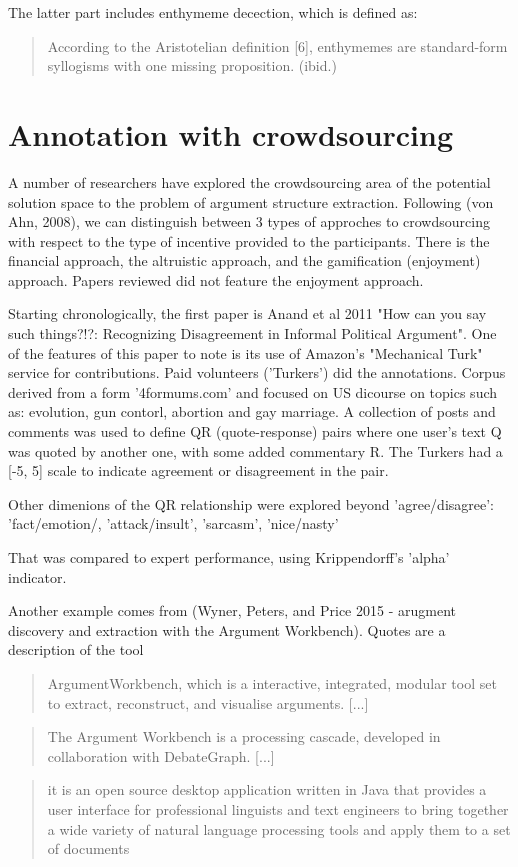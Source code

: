 \documentclass{article}
\begin{document}
The latter part includes enthymeme decection, which is defined as:
\begin{quote}
According to the Aristotelian definition [6], enthymemes are standard-form syllogisms with one missing proposition.  (ibid.)
\end{quote}
\cite[page 113]{Tefuel2017}

\section{Annotation with crowdsourcing}
A number of researchers have explored the crowdsourcing area of the potential solution space to the problem of argument structure extraction.
Following (von Ahn, 2008), we can distinguish between 3 types of approches to crowdsourcing with respect to the type of incentive provided to the participants.
There is the financial approach, the altruistic approach, and the gamification (enjoyment) approach. Papers reviewed did not feature the enjoyment approach.

Starting chronologically, the first paper is Anand et al 2011 "How can you say such things?!?: Recognizing Disagreement in Informal Political Argument".
One of the features of this paper to note is its use of Amazon's "Mechanical Turk" service for contributions. Paid volunteers ('Turkers') did the annotations. 
Corpus derived from a form '4formums.com' and focused on US dicourse on topics such as: evolution, gun contorl, abortion and gay marriage. A collection of posts and comments was used to define QR (quote-response) pairs where one user's text Q was quoted by another one, with some added commentary R. The Turkers had a [-5, 5] scale to indicate agreement or disagreement in the pair.

Other dimenions of the QR relationship were explored beyond 'agree/disagree': 'fact/emotion/, 'attack/insult', 'sarcasm', 'nice/nasty'

That was compared to expert performance, using Krippendorff's 'alpha' indicator.

Another example comes from (Wyner, Peters, and Price 2015 - arugment discovery and extraction with the Argument Workbench).
Quotes are a description of the tool
\begin{quote}
 ArgumentWorkbench, which is a interactive, integrated, modular tool set to extract, reconstruct, and visualise arguments. [...]
\end{quote}
\begin{quote}
 The Argument Workbench is a processing cascade, developed in collaboration with DebateGraph. [...]
\end{quote}
\begin{quote}
 it is an open source desktop application written in Java that provides a user interface for professional linguists and text engineers to bring together a wide variety of natural language processing tools and apply them to a set of documents
\end{quote}
\end{document}
